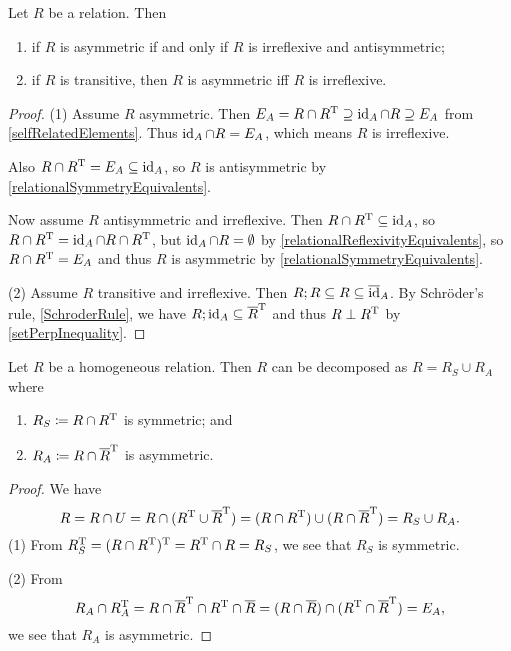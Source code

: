\begin{lemma} \label{asymmetricIrreflexive}
Let $R$ be a relation. Then
\begin{enumerate}
\item if $R$ is asymmetric \textup{if and only if} $R$ is irreflexive and antisymmetric;
\item if $R$ is transitive, then $R$ is asymmetric iff $R$ is irreflexive.
\end{enumerate}
\end{lemma}
\begin{proof}
(1) Assume $R$ asymmetric. Then  $E_A = R \cap R^{\mathrm{T}} \supseteq \operatorname{id}_A\cap R \supseteq E_A$ from \ref{selfRelatedElements}. Thus $\operatorname{id}_A\cap R = E_A$, which means $R$ is irreflexive.

Also $R\cap R^{\mathrm{T}} = E_A \subseteq \operatorname{id}_A$, so $R$ is antisymmetric by \ref{relationalSymmetryEquivalents}.

Now assume $R$ antisymmetric and irreflexive. Then $R\cap R^{\mathrm{T}} \subseteq \operatorname{id}_A$, so $R\cap R^{\mathrm{T}} = \operatorname{id}_A \cap R\cap R^{\mathrm{T}}$, but $\operatorname{id}_A\cap R = \emptyset$ by \ref{relationalReflexivityEquivalents}, so $R\cap R^{\mathrm{T}} = E_A$ and thus $R$ is asymmetric by \ref{relationalSymmetryEquivalents}.

(2) Assume $R$ transitive and irreflexive. Then $R;R \subseteq R \subseteq \overline{\operatorname{id}}_A$. By Schröder's rule, \ref{SchroderRule}, we have $R;\operatorname{id}_A \subseteq \overline{R}^{\mathrm{T}}$ and thus $R\perp R^{\mathrm{T}}$ by \ref{setPerpInequality}.
\end{proof}

\begin{proposition} \label{symmetricAsymmetricDecomposition}
Let $R$ be a homogeneous relation. Then $R$ can be decomposed as $R = R_S \cup R_A$ where
\begin{enumerate}
\item $R_S \coloneqq R \cap R^{\mathrm{T}}$ is symmetric; and
\item $R_A \coloneqq R \cap \overline{R}^{\mathrm{T}}$ is asymmetric.
\end{enumerate}
\end{proposition}
\begin{proof}
We have
\[ R = R\cap U = R\cap (R^{\mathrm{T}} \cup \overline{R}^{\mathrm{T}}) = (R \cap R^{\mathrm{T}}) \cup (R \cap \overline{R}^{\mathrm{T}}) = R_S \cup R_A. \]
(1) From $R_S^{\mathrm{T}} = (R \cap R^{\mathrm{T}})^{\mathrm{T}} = R^{\mathrm{T}} \cap R = R_S$, we see that $R_S$ is symmetric.

(2) From
\[ R_A \cap R_A^{\mathrm{T}} = R \cap \overline{R}^{\mathrm{T}} \cap R^{\mathrm{T}} \cap \overline{R} = (R \cap \overline{R}) \cap (R^{\mathrm{T}} \cap \overline{R}^{\mathrm{T}}) = E_A, \]
we see that $R_A$ is asymmetric.
\end{proof}\

